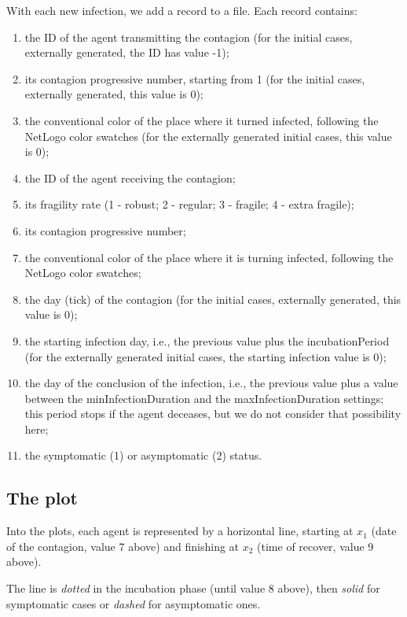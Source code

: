 \documentclass[11pt]{article}
\begin{document}
With each new infection, we add a record to a file. Each record contains:
\begin{enumerate}\addtocounter{enumi}{-1}
\setlength{\itemsep}{0pt}
\item the ID of the agent transmitting the contagion (for the initial cases, externally generated, the ID has value -1);
\item its contagion progressive number, starting from 1 (for the initial cases, externally generated, this value is 0);
\item the conventional color of the place where it turned infected, following the NetLogo color swatches (for the externally generated initial cases, this value is 0);
\item the ID of the agent receiving the contagion;
\item its fragility rate (1 - robust; 2 - regular; 3 - fragile; 4 - extra fragile);
\item its contagion progressive number;
\item the conventional color of the place where it is turning infected, following the NetLogo color swatches;
\item the day (tick) of the contagion (for the initial cases, externally generated, this value is 0);
\item the starting infection day, i.e., the previous value plus the incubationPeriod (for the externally generated initial cases, the starting infection value is 0);
\item the day of the conclusion of the infection, i.e., the previous value plus a value between the minInfectionDuration and the maxInfectionDuration settings; this period stops if the agent deceases, but we do not consider that possibility here;
\item the symptomatic (1) or asymptomatic (2) status.
\end{enumerate}

\subsection{The plot}
\label{lineStyle}

Into the plots, each agent is represented by a horizontal line, starting at $x_1$ (date of the contagion, value 7 above) and finishing at $x_2$ (time of recover, value 9 above). 

The line is \emph{dotted} in the incubation phase (until value 8 above), then \emph{solid} for symptomatic cases or \emph{dashed} for asymptomatic ones. 
\end{document}
